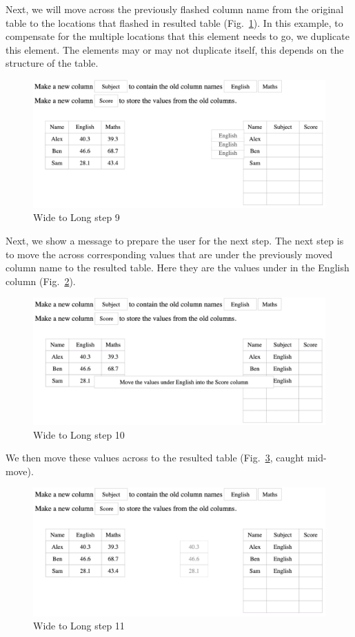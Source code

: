 \newpage
Next, we will move across the previously flashed column name from the original table to the locations that flashed in resulted table (Fig.~\ref{fig:gather9}). In this example, to compensate for the multiple locations that this element needs to go, we duplicate this element. The elements may or may not duplicate itself, this depends on the structure of the table.
\begin{figure}[H]
    \includegraphics[scale = 0.35]{Masters-Thesis/img/gather9.png}
    \caption{Wide to Long step 9}
    \label{fig:gather9}
\end{figure}

Next, we show a message to prepare the user for the next step. The next step is to move the across corresponding values that are under the previously moved column name to the resulted table. Here they are the values under in the English column (Fig.~\ref{fig:gather10}).
\begin{figure}[H]
    \includegraphics[scale = 0.35]{Masters-Thesis/img/gather10.png}
    \caption{Wide to Long step 10}
    \label{fig:gather10}
\end{figure}

\newpage
We then move these values across to the resulted table (Fig.~\ref{fig:gather11}, caught mid-move).
\begin{figure}[H]
    \includegraphics[scale = 0.35]{Masters-Thesis/img/gather11.png}
    \caption{Wide to Long step 11}
    \label{fig:gather11}
\end{figure}

